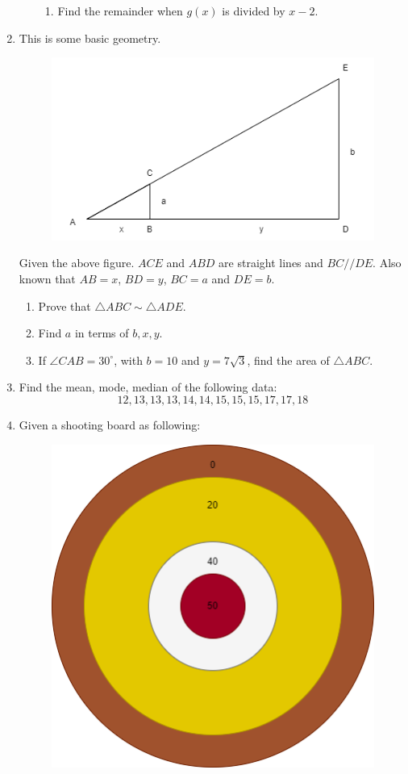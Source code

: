 \documentclass[11pt]{article}
\begin{document}
\begin{enumerate}
\begin{enumerate}
\begin{enumerate}
                \item Find the remainder when $g(x)$ is divided by $x-2$.
            \end{enumerate}
        \end{enumerate}
        \item This is some basic geometry.\begin{figure}[H]
            \centering
            \includegraphics[scale=0.6]{similar_triangle.png}
        \end{figure}Given the above figure. $ACE$ and $ABD$ are straight lines and $BC//DE$. Also known that $AB=x$, $BD=y$, $BC=a$ and $DE=b$.\begin{enumerate}
            \item Prove that $\triangle ABC\sim\triangle ADE$.
            \item Find $a$ in terms of $b,x,y$.
            \item If $\angle CAB = 30^\circ$, with $b=10$ and $y=7\sqrt{3}$, find the area of $\triangle ABC$.
        \end{enumerate}
        \item Find the mean, mode, median of the following data: $$12,13,13,13,14,14,15,15,15,17,17,18$$
        \item Given a shooting board as following:\begin{figure}[H]
            \centering
            \includegraphics[scale=0.6]{shooting_board.png}

\end{figure}
\end{enumerate}
\end{document}
